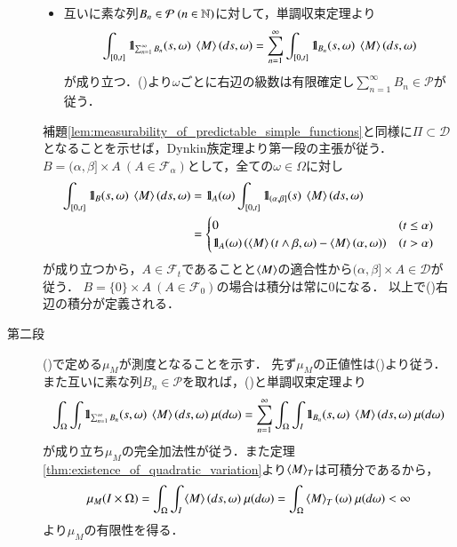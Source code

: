 \begin{prf}
\begin{description}
\begin{itemize}
					\item 互いに素な列$B_n \in \mathcal{P}\ (n \in \mathbb{N})$に対して，単調収束定理より
						\begin{align}
							\int_{[0,t]} \defunc_{\sum_{n=1}^{\infty}B_n}(s,\omega)\ \inprod<M>(ds,\omega)
							= \sum_{n=1}^{\infty} \int_{[0,t]} \defunc_{B_n}(s,\omega)\ \inprod<M>(ds,\omega)
							\label{eq:thm_composition_of_predictable_space_measure_3}
						\end{align}
						が成り立つ．()より$\omega$ごとに右辺の級数は有限確定し$\sum_{n=1}^{\infty}B_n \in \mathcal{P}$が従う．
				\end{itemize}
				補題\ref{lem:measurability_of_predictable_simple_functions}と同様に$\Pi \subset \mathcal{D}$となることを示せば，Dynkin族定理より第一段の主張が従う．
				$B = (\alpha,\beta] \times A\ (A \in \mathcal{F}_\alpha)$として，全ての$\omega \in \Omega$に対し
				\begin{align}
					\int_{[0,t]} \defunc_B(s,\omega)\ \inprod<M>(ds,\omega)
					&= \defunc_A(\omega) \int_{[0,t]} \defunc_{(\alpha,\beta]}(s)\ \inprod<M>(ds,\omega) \\
					&= \begin{cases}
						0 & (t \leq \alpha) \\
						\defunc_A(\omega)\left( \inprod<M>(t \wedge \beta,\omega) - \inprod<M>(\alpha,\omega) \right) & (t > \alpha)
					\end{cases}
				\end{align}
				が成り立つから，$A \in \mathcal{F}_t$であることと$\inprod<M>$の適合性から$(\alpha,\beta] \times A \in \mathcal{D}$が従う．
				$B = \{0\} \times A\ (A \in \mathcal{F}_0)$の場合は積分は常に0になる．
				以上で()右辺の積分が定義される．
				
			\item[第二段]
				()で定める$\mu_M$が測度となることを示す．
				先ず$\mu_M$の正値性は()より従う．
				また互いに素な列$B_n \in \mathcal{P}$を取れば，()と単調収束定理より
				\begin{align}
					\int_\Omega \int_I \defunc_{\sum_{n=1}^{\infty}B_n}(s,\omega)\ \inprod<M>(ds,\omega)\ \mu(d\omega)
					= \sum_{n=1}^{\infty} \int_\Omega \int_I \defunc_{B_n}(s,\omega)\ \inprod<M>(ds,\omega)\ \mu(d\omega)
				\end{align}
				が成り立ち$\mu_M$の完全加法性が従う．また定理\ref{thm:existence_of_quadratic_variation}より$\inprod<M>_T$は可積分であるから，
				\begin{align}
					\mu_M(I \times \Omega) = \int_\Omega \int_I \inprod<M>(ds,\omega)\ \mu(d\omega)
					= \int_\Omega \inprod<M>_T(\omega)\ \mu(d\omega)
					< \infty
				\end{align}
				より$\mu_M$の有限性を得る．
				\QED
		\end{description}
	\end{prf}
	
